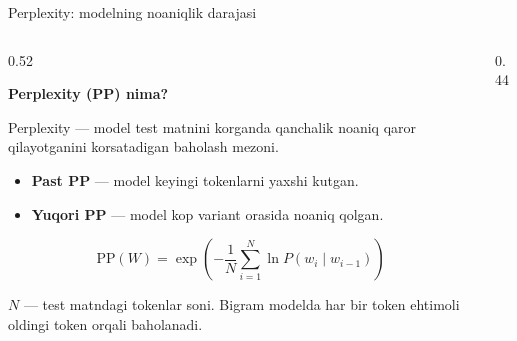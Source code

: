 \documentclass[aspectratio=169,11pt]{beamer}
\newcommand{\uzq}{\textquotesingle{}}
\begin{document}
\begin{frame}{Perplexity: modelning noaniqlik darajasi}
\footnotesize

\begin{columns}[T,totalwidth=\textwidth]
\begin{column}{0.52\textwidth}

\textbf{Perplexity (PP) nima?}

\vspace{2pt}
Perplexity — model test matnini ko\uzq{}rganda qanchalik
noaniq qaror qilayotganini ko\uzq{}rsatadigan baholash mezoni.

\vspace{3pt}

\begin{itemize}\setlength\itemsep{4pt}
  \item \textbf{Past PP} — model keyingi tokenlarni yaxshi kutgan.
  \item \textbf{Yuqori PP} — model ko\uzq{}p variant orasida noaniq qolgan.
\end{itemize}

\vspace{4pt}

\begin{tcolorbox}[defbox,left=2mm,right=2mm,top=1mm,bottom=1mm]
\[
\mathrm{PP}(W)
=
\exp\!\left(
-\frac{1}{N}
\sum_{i=1}^{N}
\ln P(w_i\mid w_{i-1})
\right)
\]
\end{tcolorbox}

\vspace{2pt}

{\scriptsize
$N$ — test matndagi tokenlar soni.  
Bigram modelda har bir token ehtimoli oldingi token orqali baholanadi.
}

\end{column}

\begin{column}{0.44\textwidth}
\centering

\end{column}
\end{columns}
\end{frame}
\end{document}
